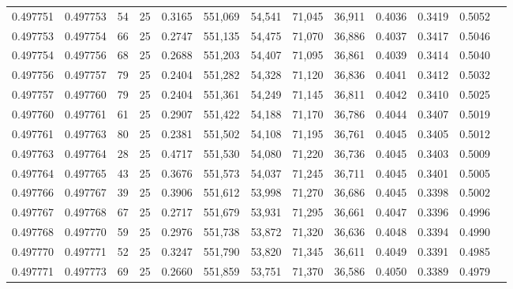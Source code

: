 \begin{tabular}{rrrrrrrrrrrrr}
0.497751 & 0.497753 &    54 &  25 &                                     0.3165 & 551,069 &  54,541 &  71,045 &  36,911 & 0.4036 & 0.3419 & 0.5052 \\
0.497753 & 0.497754 &    66 &  25 &                                     0.2747 & 551,135 &  54,475 &  71,070 &  36,886 & 0.4037 & 0.3417 & 0.5046 \\
0.497754 & 0.497756 &    68 &  25 &                                     0.2688 & 551,203 &  54,407 &  71,095 &  36,861 & 0.4039 & 0.3414 & 0.5040 \\
0.497756 & 0.497757 &    79 &  25 &                                     0.2404 & 551,282 &  54,328 &  71,120 &  36,836 & 0.4041 & 0.3412 & 0.5032 \\
0.497757 & 0.497760 &    79 &  25 &                                     0.2404 & 551,361 &  54,249 &  71,145 &  36,811 & 0.4042 & 0.3410 & 0.5025 \\
0.497760 & 0.497761 &    61 &  25 &                                     0.2907 & 551,422 &  54,188 &  71,170 &  36,786 & 0.4044 & 0.3407 & 0.5019 \\
0.497761 & 0.497763 &    80 &  25 &                                     0.2381 & 551,502 &  54,108 &  71,195 &  36,761 & 0.4045 & 0.3405 & 0.5012 \\
0.497763 & 0.497764 &    28 &  25 &                                     0.4717 & 551,530 &  54,080 &  71,220 &  36,736 & 0.4045 & 0.3403 & 0.5009 \\
0.497764 & 0.497765 &    43 &  25 &                                     0.3676 & 551,573 &  54,037 &  71,245 &  36,711 & 0.4045 & 0.3401 & 0.5005 \\
0.497766 & 0.497767 &    39 &  25 &                                     0.3906 & 551,612 &  53,998 &  71,270 &  36,686 & 0.4045 & 0.3398 & 0.5002 \\
0.497767 & 0.497768 &    67 &  25 &                                     0.2717 & 551,679 &  53,931 &  71,295 &  36,661 & 0.4047 & 0.3396 & 0.4996 \\
0.497768 & 0.497770 &    59 &  25 &                                     0.2976 & 551,738 &  53,872 &  71,320 &  36,636 & 0.4048 & 0.3394 & 0.4990 \\
0.497770 & 0.497771 &    52 &  25 &                                     0.3247 & 551,790 &  53,820 &  71,345 &  36,611 & 0.4049 & 0.3391 & 0.4985 \\
0.497771 & 0.497773 &    69 &  25 &                                     0.2660 & 551,859 &  53,751 &  71,370 &  36,586 & 0.4050 & 0.3389 & 0.4979 \\

\end{tabular}
